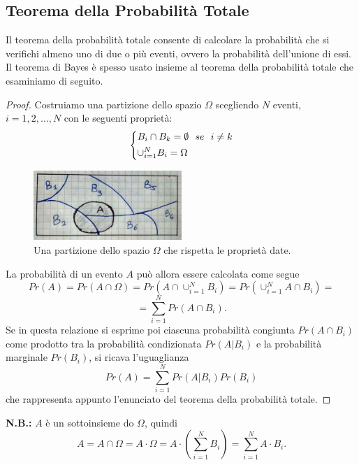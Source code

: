 \documentclass[12pt,oneside,openany]{memoir}
\numberwithin{equation}{subsection}
\begin{document}
\subsection{Teorema della Probabilit\`a Totale}
Il teorema della probabilit\`a totale consente di calcolare la probabilit\`a che
si verifichi almeno uno di due o pi\`u eventi, ovvero la probabilit\`a
dell'unione di essi.
\bigbreak
Il teorema di Bayes \`e spesso usato insieme al teorema della probabilit\`a
totale che esaminiamo di seguito.
\begin{proof}
Costruiamo una partizione dello spazio $\Omega$ scegliendo $N$ eventi,
$i = 1, 2, \dots, N$ con le seguenti propriet\`a:
\[
    \begin{dcases}
        B_i \cap B_k = \emptyset \ \ se \ \ i \neq k\\
        \cup_{i = 1}^{N} B_i = \Omega
    \end{dcases}
\]
\begin{figure}[H]
    \centering
    \captionsetup{justification=centering}
    \includegraphics[width=0.5\textwidth]{images/set_partition.jpg}
    \caption{Una partizione dello spazio $\Omega$ che rispetta le propriet\`a
    date.}
\end{figure}
\noindent
La probabilit\`a di un evento $A$ pu\`o allora essere calcolata come segue
\[
    Pr(A) = Pr(A \cap \Omega) = Pr(A \cap \cup_{i = 1}^{N} B_i) =
    Pr(\cup_{i = 1}^{N} A \cap B_i) =
\]
\[
    = \sum_{i = 1}^{N} Pr(A \cap B_i).
\]
Se in questa relazione si esprime poi ciascuna probabilit\`a congiunta
$Pr(A \cap B_i)$ come prodotto tra la probabilit\`a condizionata $Pr(A | B_i)$ e
la probabilit\`a marginale $Pr(B_i)$, si ricava l'uguaglianza
\[
    Pr(A) = \sum_{i = 1}^{N} Pr(A|B_i) Pr(B_i)
\]
che rappresenta appunto l'enunciato del teorema della probabilit\`a totale.
\end{proof}
\bigbreak\noindent
\textbf{N.B.:} $A$ \`e un sottoinsieme do $\Omega$, quindi
\[
    A = A \cap \Omega = A \cdot \Omega = A \cdot \left(\sum_{i = 1}^{N} B_i
    \right) = \sum_{i = 1}^{N} A \cdot B_i.
\]

\end{document}
